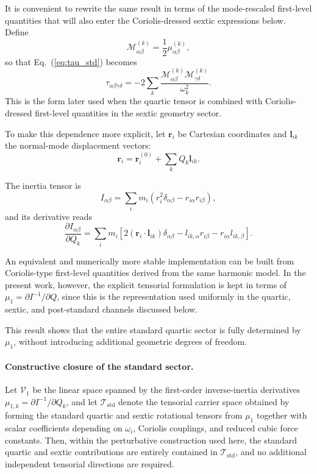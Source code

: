 \documentclass[aip,jcp,reprint,floatfix]{revtex4-2}
\begin{document}
It is convenient to rewrite the same result in terms of the
mode-rescaled first-level quantities that will also enter the
Coriolis-dressed sextic expressions below. Define
\begin{equation}
\mathcal{M}^{(k)}_{\alpha\beta}
=
\frac{1}{2}\mu^{(k)}_{\alpha\beta},
\end{equation}
so that Eq.~(\ref{eq:tau_std}) becomes
\begin{equation}
\tau_{\alpha\beta\gamma\delta}
=
-2\sum_k
\frac{
\mathcal{M}^{(k)}_{\alpha\beta}
\mathcal{M}^{(k)}_{\gamma\delta}
}{\omega_k^2}.
\label{eq:tau_std_M}
\end{equation}
This is the form later used when the quartic tensor is combined with
Coriolis-dressed first-level quantities in the sextic geometry sector.

To make this dependence more explicit, let $\mathbf{r}_i$ be Cartesian
coordinates and $\mathbf{l}_{ik}$ the normal-mode displacement vectors:
\begin{equation}
\mathbf{r}_i = \mathbf{r}_i^{(0)} + \sum_k Q_k \mathbf{l}_{ik}.
\end{equation}

The inertia tensor is
\begin{equation}
I_{\alpha\beta}
=
\sum_i m_i
\left(
r_i^2 \delta_{\alpha\beta}
-
r_{i\alpha} r_{i\beta}
\right),
\end{equation}
and its derivative reads
\begin{equation}
\frac{\partial I_{\alpha\beta}}{\partial Q_k}
=
\sum_i m_i
\left[
2 (\mathbf{r}_i \cdot \mathbf{l}_{ik}) \delta_{\alpha\beta}
-
l_{ik,\alpha} r_{i\beta}
-
r_{i\alpha} l_{ik,\beta}
\right].
\end{equation}

An equivalent and numerically more stable implementation can be built
from Coriolis-type first-level quantities derived from the same
harmonic model. In the present work, however, the explicit tensorial
formulation is kept in terms of $\mu_1=\partial I^{-1}/\partial Q$,
since this is the representation used uniformly in the quartic,
sextic, and post-standard channels discussed below.

This result shows that the entire standard quartic sector is fully
determined by $\mu_1$, without introducing additional geometric degrees
of freedom.

\paragraph*{Constructive closure of the standard sector.}
Let $\mathcal{V}_1$ be the linear space spanned by the first-order
inverse-inertia derivatives $\mu_{1,k}=\partial I^{-1}/\partial Q_k$,
and let $\mathcal{T}_{\mathrm{std}}$ denote the tensorial carrier space
obtained by forming the standard quartic and sextic rotational tensors
from $\mu_1$ together with scalar coefficients depending on
$\omega_i$, Coriolis couplings, and reduced cubic force constants.
Then, within the perturbative construction used here, the standard
quartic and sextic contributions are entirely contained in
$\mathcal{T}_{\mathrm{std}}$, and no additional independent tensorial
directions are required.
\end{document}
